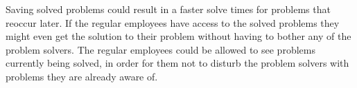 Saving solved problems could result in a faster solve times for problems that reoccur later.
If the regular employees have access to the solved problems they might even get the solution to their problem without having to bother any of the problem solvers.
The regular employees could be allowed to see problems currently being solved, in order for them not to disturb the problem solvers with problems they are already aware of.







